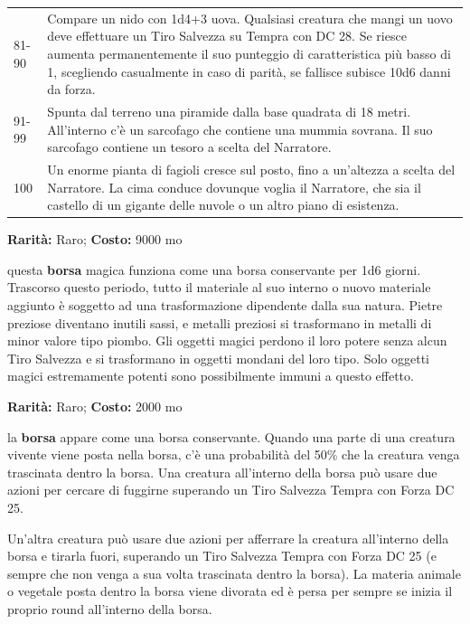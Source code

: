 \begin{multicols}{2}
\begin{tabularx}{\linewidth}{lX}
\rowcolor{gray!20}81-90 &Compare un nido con 1d4+3 uova. Qualsiasi creatura che mangi un uovo deve effettuare un Tiro Salvezza su Tempra con DC 28. Se riesce aumenta permanentemente il suo punteggio di caratteristica più basso di 1, scegliendo casualmente in caso di parità, se fallisce subisce 10d6 danni da forza.\\
91-99 &Spunta dal terreno una piramide dalla base quadrata di 18 metri. All'interno c'è un sarcofago che contiene una mummia sovrana. Il suo sarcofago contiene un tesoro a scelta del Narratore.\\
\rowcolor{gray!20}100 &Un enorme pianta di fagioli cresce sul posto, fino a un'altezza a scelta del Narratore. La cima conduce dovunque voglia il Narratore, che sia il castello di un gigante delle nuvole o un altro piano di esistenza.
\end{tabularx}
%


\medskip


\textbf{Rarità:} Raro; \textbf{Costo:} 9000 mo

questa \textbf{borsa} magica funziona come una borsa conservante per 1d6 giorni. Trascorso questo periodo, tutto il materiale al suo interno o nuovo materiale aggiunto è soggetto ad una trasformazione dipendente dalla sua natura. Pietre preziose diventano inutili sassi, e metalli preziosi si trasformano in metalli di minor valore tipo piombo. Gli oggetti magici perdono il loro potere senza alcun Tiro Salvezza e si trasformano in oggetti mondani del loro tipo. Solo oggetti magici estremamente potenti sono possibilmente immuni a questo effetto.


\textbf{Rarità:} Raro; \textbf{Costo:} 2000 mo

la \textbf{borsa} appare come una borsa conservante. Quando una parte di una creatura vivente viene posta nella borsa, c'è una probabilità del 50\% che la creatura venga trascinata dentro la borsa. Una creatura all'interno della borsa può usare due azioni per cercare di fuggirne superando un Tiro Salvezza Tempra con Forza DC 25.

Un'altra creatura può usare due azioni per afferrare la creatura all'interno della borsa e tirarla fuori, superando un Tiro Salvezza Tempra con Forza DC 25 (e sempre che non venga a sua volta trascinata dentro la borsa). La materia animale o vegetale posta dentro la borsa viene divorata ed è persa per sempre se inizia il proprio round all'interno della borsa.


\end{multicols}
